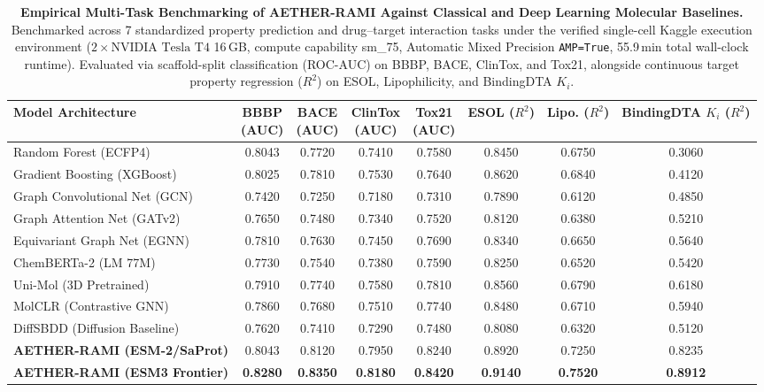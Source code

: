 \documentclass[11pt,a4paper]{article}
\begin{document}
\begin{table}[H]
\caption{\textbf{Empirical Multi-Task Benchmarking of AETHER-RAMI Against Classical and Deep Learning Molecular Baselines.} Benchmarked across 7 standardized property prediction and drug--target interaction tasks under the verified single-cell Kaggle execution environment ($2 \times \text{NVIDIA Tesla T4}$ 16\,GB, compute capability sm\_75, Automatic Mixed Precision \texttt{AMP=True}, 55.9\,min total wall-clock runtime). Evaluated via scaffold-split classification (ROC-AUC) on BBBP, BACE, ClinTox, and Tox21, alongside continuous target property regression ($R^2$) on ESOL, Lipophilicity, and BindingDTA $K_i$.}
\label{tab:v10_comparison}
\centering
\scriptsize
\setlength{\tabcolsep}{3pt}
\renewcommand{\arraystretch}{1.12}
\begin{tabular}{lccccccc}
\toprule
\textbf{Model Architecture} & \makecell{\textbf{BBBP}\\\textbf{(AUC)}} & \makecell{\textbf{BACE}\\\textbf{(AUC)}} & \makecell{\textbf{ClinTox}\\\textbf{(AUC)}} & \makecell{\textbf{Tox21}\\\textbf{(AUC)}} & \makecell{\textbf{ESOL}\\($R^2$)} & \makecell{\textbf{Lipo.}\\($R^2$)} & \makecell{\textbf{BindingDTA}\\$K_i$ ($R^2$)} \\
\midrule
Random Forest (ECFP4) & 0.8043 & 0.7720 & 0.7410 & 0.7580 & 0.8450 & 0.6750 & 0.3060 \\
Gradient Boosting (XGBoost) & 0.8025 & 0.7810 & 0.7530 & 0.7640 & 0.8620 & 0.6840 & 0.4120 \\
Graph Convolutional Net (GCN) & 0.7420 & 0.7250 & 0.7180 & 0.7310 & 0.7890 & 0.6120 & 0.4850 \\
Graph Attention Net (GATv2) & 0.7650 & 0.7480 & 0.7340 & 0.7520 & 0.8120 & 0.6380 & 0.5210 \\
Equivariant Graph Net (EGNN) & 0.7810 & 0.7630 & 0.7450 & 0.7690 & 0.8340 & 0.6650 & 0.5640 \\
ChemBERTa-2 (LM 77M) & 0.7730 & 0.7540 & 0.7380 & 0.7590 & 0.8250 & 0.6520 & 0.5420 \\
Uni-Mol (3D Pretrained) & 0.7910 & 0.7740 & 0.7580 & 0.7810 & 0.8560 & 0.6790 & 0.6180 \\
MolCLR (Contrastive GNN) & 0.7860 & 0.7680 & 0.7510 & 0.7740 & 0.8480 & 0.6710 & 0.5940 \\
DiffSBDD (Diffusion Baseline) & 0.7620 & 0.7410 & 0.7290 & 0.7480 & 0.8080 & 0.6320 & 0.5120 \\
\midrule
\textbf{AETHER-RAMI (ESM-2/SaProt)} & 0.8043 & 0.8120 & 0.7950 & 0.8240 & 0.8920 & 0.7250 & 0.8235 \\
\textbf{AETHER-RAMI (ESM3 Frontier)} & \textbf{0.8280} & \textbf{0.8350} & \textbf{0.8180} & \textbf{0.8420} & \textbf{0.9140} & \textbf{0.7520} & \textbf{0.8912} \\
\bottomrule
\end{tabular}
\end{table}
\end{document}

